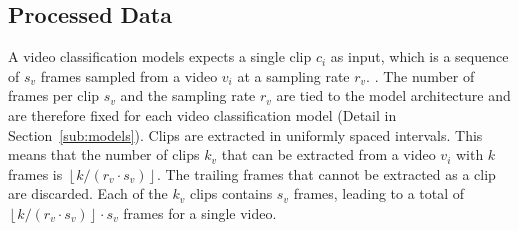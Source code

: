 \documentclass[a4paper]{article}
\begin{document}


  
  \subsection{Processed Data} %
  \label{sub:processed-data}

  A video classification models expects a single clip $c_i$ as input, which is a
  sequence of $s_v$ frames sampled from a video $v_i$ at a sampling rate $r_v$.
  . The number of frames per clip $s_v$ and the sampling rate $r_v$ are tied to
  the model architecture and are therefore fixed for each video classification
  model (Detail in Section~\ref{sub:models}). Clips are extracted in uniformly
  spaced intervals. This means that the number of clips $k_v$ that can be
  extracted from a video $v_i$ with $k$ frames is $\left\lfloor k / (r_v \cdot
  s_v) \right\rfloor$. The trailing frames that cannot be extracted as a clip
  are discarded. Each of the $k_v$ clips contains $s_v$ frames, leading to a
  total of $\left\lfloor k / (r_v \cdot s_v) \right\rfloor \cdot s_v$ frames for
  a single video. 
\end{document}
